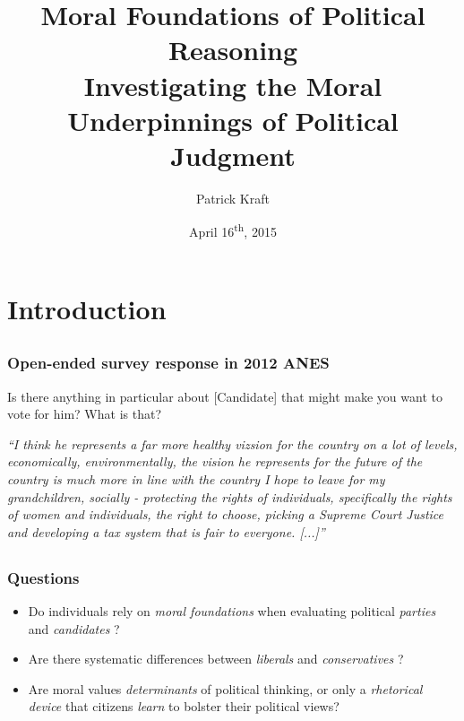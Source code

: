 \documentclass{beamer}
\author[Patrick Kraft]{Patrick Kraft}
\institute[Stony Brook]{73rd MPSA Conference}
\title[Moral Foundations of Political Reasoning]{Moral Foundations of Political Reasoning \\ {\small Investigating the Moral Underpinnings of Political Judgment}}
\date{April 16\textsuperscript{th}, 2015}
\begin{document}
\frame{\titlepage}


\section{Introduction}
\subsection{}
\begin{frame}%
\frametitle{Open-ended survey response in 2012 ANES}
\begin{exampleblock}{Is there anything in particular about [Candidate] that might make you want to vote for him? What is that?}
  \begin{center}
    \textit{``I think he represents a far more healthy vizsion for the country on a lot of levels, economically, environmentally, the vision he represents for the future of the country is much more in line with the country I hope to leave for my grandchildren, socially - protecting the rights of individuals, specifically the rights of women and individuals, the right to choose, picking a Supreme Court Justice and developing a tax system that is fair to everyone. [...]''}
  \end{center}
\end{exampleblock}
\end{frame}

\subsection{}
\begin{frame}%
  \frametitle{Questions}
  \begin{itemize}
    \item Do individuals rely on \emph{moral foundations} when evaluating political \emph{parties} and \emph{candidates} \citep{haidt2008moral}?
    \item Are there systematic differences between \emph{liberals} and \emph{conservatives} \citep{haidt2007morality,graham2009liberals}?
    \item Are moral values \emph{determinants} of political thinking, or only a \emph{rhetorical device} that citizens \emph{learn} to bolster their political views?
  \end{itemize}
\end{frame}

\section{}
\end{document}
